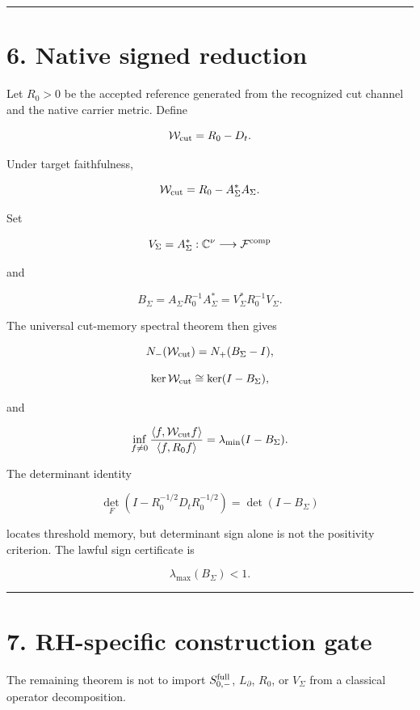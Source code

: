 \begin{center}\rule{0.5\linewidth}{0.5pt}\end{center}

\hypertarget{native-signed-reduction}{%
\section{6. Native signed reduction}\label{native-signed-reduction}}

Let \(R_0>0\) be the accepted reference generated from the recognized cut
channel and the native carrier metric. Define

\[
\mathcal W_{\rm cut}=R_0-D_t.
\]

Under target faithfulness,

\[
\mathcal W_{\rm cut}
=R_0-A_\Sigma^*A_\Sigma.
\]

Set

\[
V_\Sigma=A_\Sigma^*:
\mathbb C^\nu\longrightarrow\mathcal F^{\rm comp}
\]

and

\[
B_\Sigma
=A_\Sigma R_0^{-1}A_\Sigma^*
=V_\Sigma^*R_0^{-1}V_\Sigma.
\]

The universal cut-memory spectral theorem then gives

\[
N_-(\mathcal W_{\rm cut})=N_+(B_\Sigma-I),
\]

\[
\ker\mathcal W_{\rm cut}\cong\ker(I-B_\Sigma),
\]

and

\[
\inf_{f\ne0}
\frac{\langle f,\mathcal W_{\rm cut}f\rangle}
     {\langle f,R_0f\rangle}
=
\lambda_{\min}(I-B_\Sigma).
\]

The determinant identity

\[
\det_F(I-R_0^{-1/2}D_tR_0^{-1/2})
=
\det(I-B_\Sigma)
\]

locates threshold memory, but determinant sign alone is not the positivity
criterion. The lawful sign certificate is

\[
\lambda_{\max}(B_\Sigma)<1.
\]

\begin{center}\rule{0.5\linewidth}{0.5pt}\end{center}

\hypertarget{rh-specific-construction-gate}{%
\section{7. RH-specific construction gate}\label{rh-specific-construction-gate}}

The remaining theorem is not to import \(S_{0,-}^{\rm full}\), \(L_\partial\),
\(R_0\), or \(V_\Sigma\) from a classical operator decomposition.

